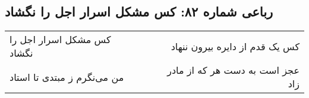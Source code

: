 \begin{center}
\section*{رباعی شماره ۸۲: کس مشکل اسرار اجل را نگشاد}
\label{sec:sh082}
\begin{longtable}{l p{0.5cm} r}
کس مشکل اسرار اجل را نگشاد
&&
کس یک قدم از دایره بیرون ننهاد
\\
من می‌نگرم ز مبتدی تا استاد
&&
عجز است به دست هر که از مادر زاد
\\
\end{longtable}
\end{center}
